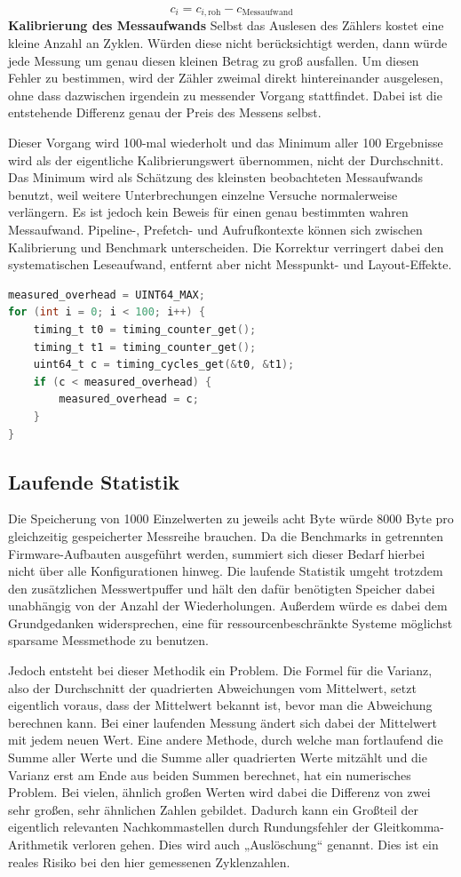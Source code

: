 \[c_i = c_{i,\mathrm{roh}} - c_{\mathrm{Messaufwand}}\]
\textbf{Kalibrierung des Messaufwands }Selbst das Auslesen des Zählers kostet eine kleine Anzahl an Zyklen. Würden diese nicht berücksichtigt werden, dann würde jede Messung um genau diesen kleinen Betrag zu groß ausfallen. Um diesen Fehler zu bestimmen, wird der Zähler zweimal direkt hintereinander ausgelesen, ohne dass dazwischen irgendein zu messender Vorgang stattfindet. Dabei ist die entstehende Differenz genau der Preis des Messens selbst.

Dieser Vorgang wird 100-mal wiederholt und das Minimum aller 100 Ergebnisse wird als der eigentliche Kalibrierungswert übernommen, nicht der Durchschnitt. Das Minimum wird als Schätzung des kleinsten beobachteten Messaufwands benutzt, weil weitere Unterbrechungen einzelne Versuche normalerweise verlängern. Es ist jedoch kein Beweis für einen genau bestimmten wahren Messaufwand. Pipeline-, Prefetch- und Aufrufkontexte können sich zwischen Kalibrierung und Benchmark unterscheiden. Die Korrektur verringert dabei den systematischen Leseaufwand, entfernt aber nicht Messpunkt- und Layout-Effekte.

\begin{lstlisting}[style=basecode,language=C]
measured_overhead = UINT64_MAX;
for (int i = 0; i < 100; i++) {
    timing_t t0 = timing_counter_get();
    timing_t t1 = timing_counter_get();
    uint64_t c = timing_cycles_get(&t0, &t1);
    if (c < measured_overhead) {
        measured_overhead = c;
    }
}
\end{lstlisting}
\subsection{Laufende Statistik}
Die Speicherung von 1000 Einzelwerten zu jeweils acht Byte würde 8000 Byte pro gleichzeitig gespeicherter Messreihe brauchen. Da die Benchmarks in getrennten Firmware-Aufbauten ausgeführt werden, summiert sich dieser Bedarf hierbei nicht über alle Konfigurationen hinweg. Die laufende Statistik umgeht trotzdem den zusätzlichen Messwertpuffer und hält den dafür benötigten Speicher dabei unabhängig von der Anzahl der Wiederholungen. Außerdem würde es dabei dem Grundgedanken widersprechen, eine für ressourcenbeschränkte Systeme möglichst sparsame Messmethode zu benutzen.

Jedoch entsteht bei dieser Methodik ein Problem. Die Formel für die Varianz, also der Durchschnitt der quadrierten Abweichungen vom Mittelwert, setzt eigentlich voraus, dass der Mittelwert bekannt ist, bevor man die Abweichung berechnen kann. Bei einer laufenden Messung ändert sich dabei der Mittelwert mit jedem neuen Wert. Eine andere Methode, durch welche man fortlaufend die Summe aller Werte und die Summe aller quadrierten Werte mitzählt und die Varianz erst am Ende aus beiden Summen berechnet, hat ein numerisches Problem. Bei vielen, ähnlich großen Werten wird dabei die Differenz von zwei sehr großen, sehr ähnlichen Zahlen gebildet. Dadurch kann ein Großteil der eigentlich relevanten Nachkommastellen durch Rundungsfehler der Gleitkomma-Arithmetik verloren gehen. Dies wird auch „Auslöschung“ genannt. Dies ist ein reales Risiko bei den hier gemessenen Zyklenzahlen.

